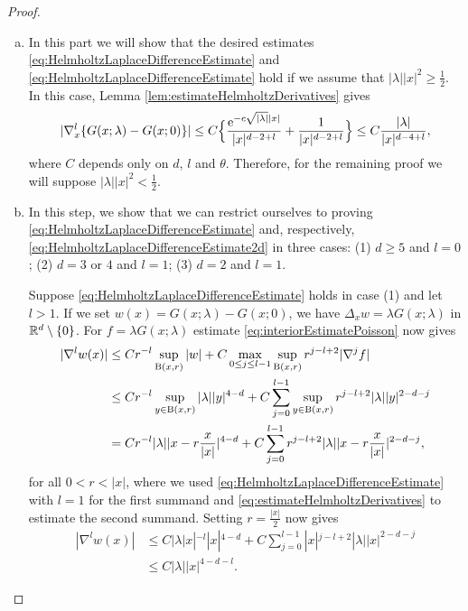 \begin{proof}
  \begin{enumerate}[(a)]
    \item In this part we will show that the desired estimates \eqref{eq:HelmholtzLaplaceDifferenceEstimate} and \eqref{eq:HelmholtzLaplaceDifferenceEstimate} hold if we assume that $|\lambda| |x|^2 \geq \frac{1}{2}$.
    In this case, Lemma \ref{lem:estimateHelmholtzDerivatives} gives
    \begin{align*}
      |\nabla_x^l \{ G(x; \lambda) - G(x; 0) \} |
      \leq C \Big\{ \frac{\mathrm{e}^{-c \sqrt{|\lambda|} |x|}}{|x|^{d - 2 + l}} + \frac{1}{|x|^{d - 2 + l}} \Big\} \leq C \frac{|\lambda|}{|x|^{d - 4 + l}},
    \end{align*}
    where $C$ depends only on $d$, $l$ and $\theta$.
    Therefore, for the remaining proof we will suppose $|\lambda||x|^2 < \frac{1}{2}$.
  \item In this step, we show that we can restrict ourselves to proving \eqref{eq:HelmholtzLaplaceDifferenceEstimate} and, respectively, \eqref{eq:HelmholtzLaplaceDifferenceEstimate2d} in three cases: (1) $d \geq 5$ and $l = 0$; (2) $d = 3$ or $4$ and $l = 1$; (3) $d = 2$ and $l = 1$.
    
    Suppose \eqref{eq:HelmholtzLaplaceDifferenceEstimate} holds in case (1) and let $l > 1$.
    If we set $ w(x) = G(x;\lambda) - G(x;0) $, we have $\Delta_x w = \lambda G(x; \lambda)$ in $\mathbb{R}^d \setminus \{0\}$.
    For $f = \lambda G(x; \lambda)$ estimate \eqref{eq:interiorEstimatePoisson} now gives
    \begin{align*}
      |\nabla^l w(x) |
      &\leq C r^{-l} \sup_{\mathrm{B}(x,r)} |w| + C \max_{0 \leq j \leq l - 1} \sup_{\mathrm{B}(x,r)} r^{j - l + 2} |\nabla^j f| \\
      &\leq C r^{-l} \sup_{y \in \mathrm{B}(x,r)} |\lambda| |y|^{4 - d} + C \sum_{j = 0}^{l - 1} \sup_{y \in \mathrm{B}(x,r)} r^{j - l + 2} |\lambda| |y|^{2 - d - j} \\
      &= C r^{-l} |\lambda| |x - r \frac{x}{|x|} |^{4 - d} + C \sum_{j = 0}^{l - 1} r^{j - l + 2} |\lambda| |x - r \frac{x}{|x|} |^{2 - d - j},
    \end{align*}
    for all $0 < r < |x|$, where we used \eqref{eq:HelmholtzLaplaceDifferenceEstimate} with $l = 1$ for the first summand and \eqref{eq:estimateHelmholtzDerivatives} to estimate the second summand.
    Setting $r = \frac{|x|}{2}$ now gives
    \begin{align*}
      |\nabla^l w(x)| 
      &\leq C |\lambda |x|^{-l} |x|^{4 - d} + C \sum_{j = 0}^{l - 1} |x|^{j - l + 2} |\lambda| |x|^{2 - d - j} \\
      &\leq C |\lambda| |x|^{4 - d - l}.
    \end{align*}


\end{enumerate}
\end{proof}
